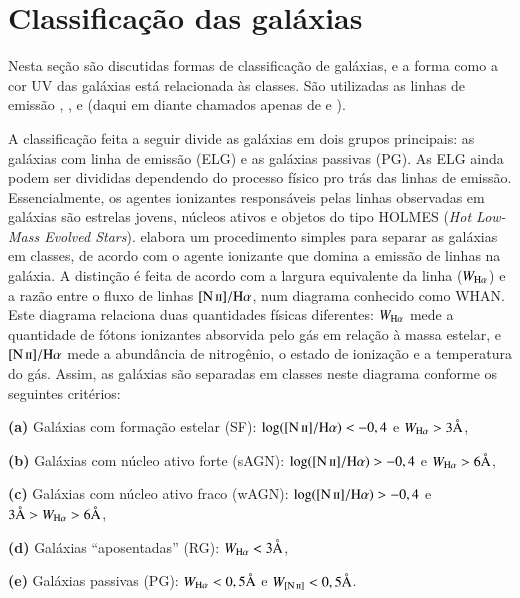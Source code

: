 
\section{Classificação das galáxias}

Nesta seção são discutidas formas de classificação de galáxias, e a forma como a
cor UV das galáxias está relacionada às classes. São utilizadas as linhas de
emissão \Halpha, \Hbeta, \NII e \OIII (daqui em diante chamados apenas de \nII e
\oIII).

A classificação feita a seguir divide as galáxias em dois grupos principais: as
galáxias com linha de emissão (ELG) e as galáxias passivas (PG). As ELG ainda
podem ser divididas dependendo do processo físico pro trás das linhas de
emissão. Essencialmente, os agentes ionizantes responsáveis pelas linhas
observadas em galáxias são estrelas jovens, núcleos ativos e objetos do tipo
HOLMES ({\em Hot Low-Mass Evolved Stars}). \citet{CidFernandes2011} elabora um
procedimento simples para separar as galáxias em classes, de acordo com o agente
ionizante que domina a emissão de linhas na galáxia. A distinção é feita de
acordo com a largura equivalente da linha \Halpha ($W_{\mathrm{H}\alpha}$) e a razão entre o
fluxo de linhas $\nII/\Halpha$, num diagrama conhecido como WHAN. Este diagrama
relaciona duas quantidades físicas diferentes: $W_{\mathrm{H}\alpha}$ mede a quantidade de
fótons ionizantes absorvida pelo gás em relação à massa estelar, e
$\nII/\Halpha$ mede a abundância de nitrogênio, o estado de ionização e a
temperatura do gás. Assim, as galáxias são separadas em classes neste diagrama
conforme os seguintes critérios:

\begin{list}{}{\setlength\itemsep{0pt}}
\item \textbf{(a)} Galáxias com formação estelar (SF): $\log(\nII/\Halpha) <
-0,4$ e $W_{\mathrm{H}\alpha} > 3\text{\AA}$,
\item \textbf{(b)} Galáxias com núcleo ativo forte (sAGN): $\log(\nII/\Halpha) >
-0,4$ e $W_{\mathrm{H}\alpha} > 6\text{\AA}$,
\item \textbf{(c)} Galáxias com núcleo ativo fraco (wAGN): $\log(\nII/\Halpha) >
-0,4$ e $3\text{\AA} > W_{\mathrm{H}\alpha} > 6\text{\AA}$,
\item \textbf{(d)} Galáxias ``aposentadas'' (RG): $W_{\mathrm{H}\alpha} < 3\text{\AA}$,
\item \textbf{(e)} Galáxias passivas (PG): $W_{\mathrm{H}\alpha} < 0,5\text{\AA}$ e $W_{\mathrm{[N\,\textsc{ii}]}} <
0,5\text{\AA}$.
\end{list}

